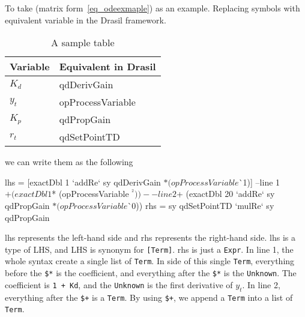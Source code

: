 
To take (matrix form~\ref{eq_odeexmaple}) as an example. Replacing symbols with equivalent variable in the Drasil framework.

\begin{table}
	\begin{tabular}{ p{} p{} }
		\textbf{Variable} & \textbf{Equivalent in Drasil} \\
		\toprule
		$K_d$ & qdDerivGain\\
		$y_t$ & opProcessVariable\\
		$K_p$ & qdPropGain\\
		$r_t$ & qdSetPointTD\\
		\bottomrule	
	\end{tabular}	
	\caption{A sample table}	
	\label{tab_inputtype}
\end{table}

we can write them as the following
\begin{haskell1}
lhs = [exactDbl 1 `addRe` sy qdDerivGain $* (opProcessVariable $^^ 1)] --line 1
 $+ (exactDbl 1 $* (opProcessVariable $^^ 2)) -- line 2
 $+ (exactDbl 20 `addRe` sy qdPropGain $* (opProcessVariable $^^ 0))
rhs = sy qdSetPointTD `mulRe` sy qdPropGain
\end{haskell1}

lhs represents the left-hand side and rhs represents the right-hand side. lhs is a type of LHS, and LHS is synonym for \verb|[Term]|. rhs is just a \verb|Expr|. In line 1, the whole syntax create a single list of \verb|Term|. In side of this single \verb|Term|, everything before the \verb|$*| is the coefficient, and everything after the \verb|$*| is the \verb|Unknown|. The coefficient is \verb|1 + Kd|, and the \verb|Unknown| is the first derivative of $y_t$. In line 2, everything after the \verb|$+| is a \verb|Term|. By using \verb|$+|, we append a \verb|Term| into a list of \verb|Term|.

